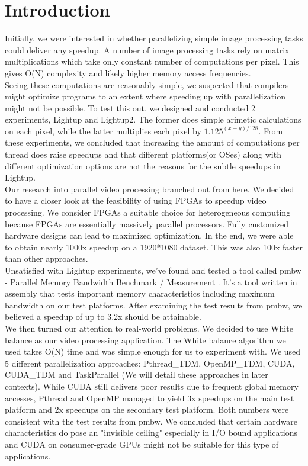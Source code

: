 \documentclass{acm_proc_article-sp}
\begin{document}
\section{Introduction}
Initially, we were interested in whether parallelizing simple image processing tasks could deliver any speedup. A number of image processing tasks rely on matrix multiplications which take only constant number of computations per pixel. This gives O(N) complexity and likely higher memory access frequencies. \\
Seeing these computations are reasonably simple, we suspected that compilers might optimize programs to an extent where speeding up with parallelization might not be possible. To test this out, we designed and conducted 2 experiments, Lightup and Lightup2. The former does simple arimetic calculations on each pixel, while the latter multiplies each pixel by \(1.125^{(x+y)/128}\). From these experiments, we concluded that increasing the amount of computations per thread does raise speedups and that different platforms(or OSes) along with different optimization options are not the reasons for the subtle speedups in Lightup. \\
Our research into parallel video processing branched out from here. We decided to have a closer look at the feasibility of using FPGAs to speedup video processing. We consider FPGAs a suitable choice for heterogeneous computing because FPGAs are essentially massively parallel processors. Fully customized hardware designs can lead to maximized optimization. In the end, we were able to obtain nearly 1000x speedup on a 1920*1080 dataset. This was also 100x faster than other approaches. \\
Unsatisfied with Lightup experiments, we've found and tested a tool called pmbw - Parallel Memory Bandwidth Benchmark / Measurement \cite{pmbw}. It's a tool written in assembly that tests important memory characteristics including maximum bandwidth on our test platforms. After examining the test results from pmbw, we believed a speedup of up to 3.2x should be attainable. \\
We then turned our attention to real-world problems. We decided to use White balance as our video processing application. The White balance algorithm \cite{gray_world} we used takes O(N) time and was simple enough for us to experiment with. We used 5 different parallelization approaches: Pthread\_TDM, OpenMP\_TDM, CUDA, CUDA\_TDM and TaskParallel (We will detail these approaches in later contexts). While CUDA still delivers poor results due to frequent global memory accesses, Pthread and OpenMP managed to yield 3x speedups on the main test platform and 2x speedups on the secondary test platform. Both numbers were consistent with the test results from pmbw. We concluded that certain hardware characteristics do pose an "invisible ceiling" especially in I/O bound applications and CUDA on consumer-grade GPUs might not be suitable for this type of applications.
\end{document}
